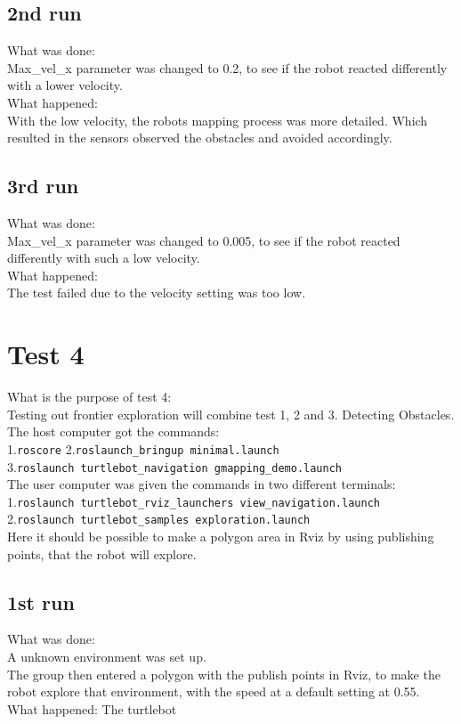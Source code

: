 \subsection{2nd run}
What was done:\\
Max\_vel\_x parameter was changed to 0.2, to see if the robot reacted differently with a lower velocity.\\
What happened:\\
With the low velocity, the robots mapping process was more detailed. Which resulted in the sensors observed the obstacles and avoided accordingly.

\subsection{3rd run}
What was done:\\
Max\_vel\_x parameter was changed to 0.005, to see if the robot reacted differently with such a low velocity.\\
What happened:\\
The test failed due to the velocity setting was too low.

%
%

\section{Test 4} 
What is the purpose of test 4:\\
Testing out frontier exploration will combine test 1, 2 and 3. Detecting Obstacles.\\ 
The host computer got the commands:\\
1.\texttt{roscore} 
2.\texttt{roslaunch\_bringup minimal.launch}\\
3.\texttt{roslaunch turtlebot\_navigation gmapping\_demo.launch}\\
The user computer was given the commands in two different terminals:\\
1.\texttt{roslaunch turtlebot\_rviz\_launchers view\_navigation.launch}\\
2.\texttt{roslaunch turtlebot\_samples exploration.launch}\\
Here it should be possible to make a polygon area in Rviz by using publishing points, that the robot will explore.

\subsection{1st run}
What was done:\\
A unknown environment was set up.\\ 
The group then entered a polygon with the publish points in Rviz, to make the robot explore that environment, with the speed at a default setting at 0.55.\\
What happened:
The turtlebot 
\\


